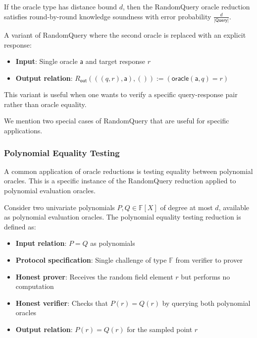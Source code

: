 \begin{theorem}
    If the oracle type has distance bound $d$, then the RandomQuery oracle reduction satisfies round-by-round knowledge soundness with error probability $\frac{d}{|\mathsf{Query}|}$.
\end{theorem}

\begin{definition}
    \label{def:randomquery_with_response}
    A variant of RandomQuery where the second oracle is replaced with an explicit response:
    \begin{itemize}
        \item \textbf{Input}: Single oracle $\mathsf{a}$ and target response $r$
        \item \textbf{Output relation}: $R_{\mathsf{out}}(((q, r), \mathsf{a}), ()) := (\mathsf{oracle}(\mathsf{a}, q) = r)$
    \end{itemize}
    This variant is useful when one wants to verify a specific query-response pair rather than oracle equality.
\end{definition}

We mention two special cases of RandomQuery that are useful for specific applications.

\subsubsection{Polynomial Equality Testing}

A common application of oracle reductions is testing equality between polynomial oracles. This is a specific instance of the RandomQuery reduction applied to polynomial evaluation oracles.

\begin{definition}
    \label{def:polynomial_equality_testing}
    Consider two univariate polynomials $P, Q \in \mathbb{F}[X]$ of degree at most $d$, available as polynomial evaluation oracles. The polynomial equality testing reduction is defined as:
    \begin{itemize}
        \item \textbf{Input relation}: $P = Q$ as polynomials
        \item \textbf{Protocol specification}: Single challenge of type $\mathbb{F}$ from verifier to prover
        \item \textbf{Honest prover}: Receives the random field element $r$ but performs no computation
        \item \textbf{Honest verifier}: Checks that $P(r) = Q(r)$ by querying both polynomial oracles
        \item \textbf{Output relation}: $P(r) = Q(r)$ for the sampled point $r$
    \end{itemize}
\end{definition}

